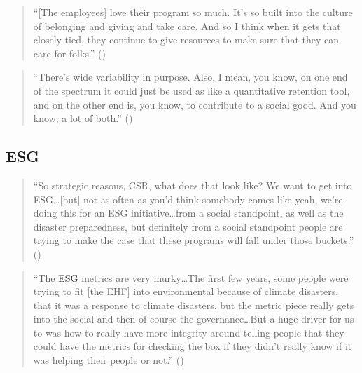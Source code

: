 \documentclass[
  11pt,
  oneside]{article}
\begin{document}
\begin{quote}
``{[}The employees{]} love their program so much. It's so built into the culture of belonging and giving and take care. And so I think when it gets that closely tied, they continue to give resources to make sure that they can care for folks.'' ()
\end{quote}

\begin{quote}
``There's wide variability in purpose. Also, I mean, you know, on one end of the spectrum it could just be used as like a quantitative retention tool, and on the other end is, you know, to contribute to a social good. And you know, a lot of both.'' ()
\end{quote}

\subsection{ESG}\label{esg}

\begin{quote}
``So strategic reasons, CSR, what does that look like? We want to get into ESG\ldots{[}but{]} not as often as you'd think somebody comes like yeah, we're doing this for an ESG initiative\ldots from a social standpoint, as well as the disaster preparedness, but definitely from a social standpoint people are trying to make the case that these programs will fall under those buckets.'' ()
\end{quote}

\begin{quote}
``The \hyperref[esg]{ESG} metrics are very murky\ldots The first few years, some people were trying to fit {[}the EHF{]} into environmental because of climate disasters, that it was a response to climate disasters, but the metric piece really gets into the social and then of course the governance\ldots But a huge driver for us to was how to really have more integrity around telling people that they could have the metrics for checking the box if they didn't really know if it was helping their people or not.'' ()
\end{quote}
\end{document}
